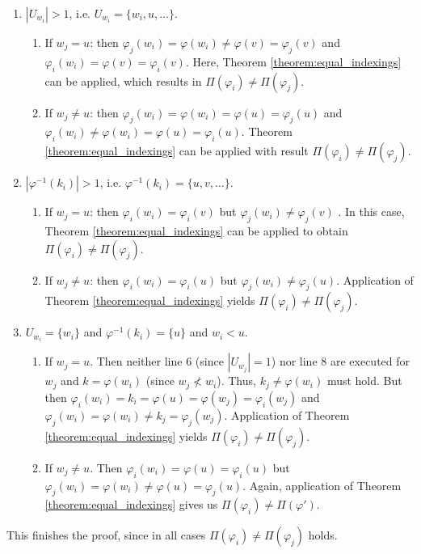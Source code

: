 \documentclass[11pt,a4paper]{article}
\numberwithin{equation}{section}
\newcommand{\idx}{\varphi}
\begin{document}
\begin{appendixproof}
\begin{enumerate}
\begin{enumerate}
            \begin{enumerate}
                \item $|U_{w_i}| >1$, i.e. $U_{w_i} = \{w_i,u,\dots\}$. 
                \begin{enumerate}
                    \item If $w_j = u$: then $\idx_j(w_i) = \idx(w_i) \neq \idx(v) = \idx_j(v)$ and $\idx_i(w_i) = \idx(v) = \idx_i(v)$. Here, Theorem \ref{theorem:equal_indexings} can be applied, which results in $\Pi(\idx_i) \neq \Pi(\idx_j)$.
                    \item If $w_j \neq u$: then $\idx_j(w_i) = \idx(w_i) = \idx(u) = \idx_j(u)$ and $\idx_i(w_i) \neq \idx(w_i) = \idx(u) = \idx_i(u)$. Theorem \ref{theorem:equal_indexings} can be applied with result $\Pi(\idx_i) \neq \Pi(\idx_j)$.
                \end{enumerate}
                \item $|\idx^{-1}(k_i)| > 1$, i.e. $\idx^{-1}(k_i) = \{u,v,\dots\}$.
                \begin{enumerate}
                    \item If $w_j = u$: then $\idx_i(w_i) = \idx_i(v)$ but $\idx_j(w_i) \neq \idx_j(v)$ . In this case, Theorem \ref{theorem:equal_indexings} can be applied to obtain $\Pi(\idx_i) \neq \Pi(\idx_j)$.
                    \item If $w_j \neq u$: then $\idx_i(w_i) = \idx_i(u)$ but $\idx_j(w_i) \neq \idx_j(u)$. Application of Theorem \ref{theorem:equal_indexings} yields $\Pi(\idx_i) \neq \Pi(\idx_j)$.
                \end{enumerate}
                \item $U_{w_i} = \{ w_i \}$ and $\idx^{-1}(k_i) = \{ u \}$ and $w_i < u$.
                \begin{enumerate}
                    \item If $w_j = u$. Then neither line 6 (since $|U_{w_j}| = 1$) nor line 8 are executed for $w_j$ and $k = \idx(w_i)$ (since $w_j \not < w_i$). Thus, $k_j \neq \idx(w_i)$ must hold. But then $\idx_i(w_i) = k_i = \idx(u) = \idx(w_j) = \idx_i(w_j)$ and $\idx_j(w_i) = \idx(w_i) \neq k_j = \idx_j(w_j)$. Application of Theorem \ref{theorem:equal_indexings} yields $\Pi(\idx_i) \neq \Pi(\idx_j)$.
                    \item If $w_j \neq u$. Then $\idx_i(w_i) = \idx(u) = \idx_i(u)$ but $\idx_j(w_i) = \idx(w_i) \neq \idx(u) = \idx_j(u)$. Again, application of Theorem \ref{theorem:equal_indexings} gives us $\Pi(\idx_i) \neq \Pi(\idx')$.
                \end{enumerate} 
            \end{enumerate}
        \end{enumerate}
    \end{enumerate}
    This finishes the proof, since in all cases $\Pi(\idx_i) \neq \Pi(\idx_j)$ holds.
\end{appendixproof}
\end{document}
